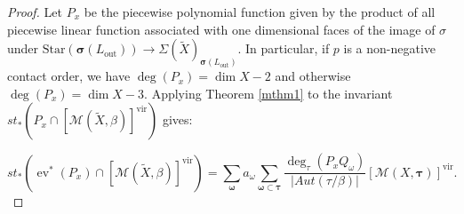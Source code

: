 \documentclass[12pt, oneside]{amsart}   	%
\newcounter{thm}
\newcommand{\vir}{\operatorname{vir}}
\newcommand{\vdim}{\operatorname{vdim}}
\newcommand{\ev}{\operatorname{ev}}
\newcommand{\out}{\operatorname{out}}
\numberwithin{equation}{section}
\numberwithin{thm}{section}
\numberwithin{figure}{section}
\begin{document}
\begin{proof}



Let $P_{x}$ be the piecewise polynomial function given by the product of all piecewise linear function associated with one dimensional faces of the image of $\sigma$ under $\text{Star}(\pmb\sigma(L_{\out})) \rightarrow \Sigma(\widetilde{X})_{\pmb\sigma(L_{\out})}$. In particular, if $p$ is a non-negative contact order, we have $\deg(P_{x}) = \dim X -2$ and otherwise $\deg(P_x) = \dim X - 3$. Applying Theorem \ref{mthm1} to the invariant $st_*(P_{x}\cap[\mathscr{M}(\widetilde{X},\beta)]^{\vir})$ gives:
 
 \begin{equation}
 st_*(\ev^*(P_x)\cap[\mathscr{M}(\widetilde{X},\beta)]^{\vir}) = \sum_{\pmb\omega}  a_{\omega}\sum_{\pmb\omega\subset \pmb\tau} \frac{\deg_{\tau}(P_xQ_{\omega})}{|Aut(\tau/\beta)|}[\mathscr{M}(X,\pmb\tau)]^{\vir}.
 \end{equation}
 

\end{proof}
\end{document}
